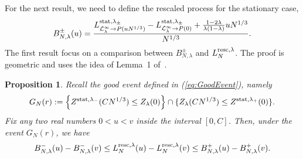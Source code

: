 \documentclass[12pt,a4paper]{article}
\numberwithin{equation}{section}
\newtheorem{prop}{Proposition}[section]
\begin{document}
For the next result, we need to define the rescaled process for the stationary case,
\begin{equation}\label{DefScaledLPPStat}
B^{\pm}_{N,\lambda}(u)= \frac{L^{{\rm stat},\lambda_\pm}_{{\cal L}^\infty_\lambda\to P(uN^{1/3})}-L^{{\rm stat},\lambda_\pm}_{{\cal L}^\infty_\lambda\to P(0)}+ \frac{1-2\lambda}{\lambda(1-\lambda)}uN^{1/3}}{N^{1/3}}.
\end{equation}
The first result focus on a comparison between $B^{\pm}_{N,\lambda}$ and $L^{{\rm resc},\lambda}_N$. The proof is geometric and uses the idea of Lemma~1 of~\cite{CP15b}.
\begin{prop}\label{SandwithLemma}
Recall the good event defined in (\ref{eq:GoodEvent}), namely
\begin{equation}
G_{N}(r):= \left\{Z^{{\rm stat},\lambda_-}(CN^{1/3})\leq Z_\lambda(0)\right\} \cap \{Z_\lambda(CN^{1/3})\leq Z^{{\rm stat},\lambda_+}(0)\}.
\end{equation}
Fix any two real numbers $0<u<v$ inside the interval $[0,C]$. Then, under the event $G_N(r)$, we have
\begin{align}\label{eq:NewEventProperty}
B^{-}_{N,\lambda}(u)-B^{-}_{N,\lambda}(v)\leq L^{{\rm resc},\lambda}_{N}(u)- L^{{\rm resc},\lambda}_{N}(v) \leq B^{+}_{N,\lambda}(u) - B^{+}_{N,\lambda}(v).
\end{align}
\end{prop}
\end{document}
